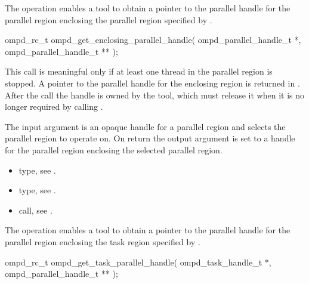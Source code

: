 \label{subsubsubsec:ompd_get_enclosing_parallel_handle}
\summary
The    operation enables a tool to obtain a
pointer to the parallel handle for the parallel region enclosing the parallel region specified by
.

\format

\begin{cspecific}
\begin{ompSyntax}
ompd_rc_t ompd_get_enclosing_parallel_handle(
  ompd_parallel_handle_t *,
  ompd_parallel_handle_t **
);
\end{ompSyntax}
\end{cspecific}


\descr
This call is meaningful only if at least one thread in the parallel region is stopped.
A pointer to the parallel handle for the enclosing region is returned in
. After the call the handle is owned by the tool, which must
release it when it is no longer required by calling .

\argdesc
The input argument  is an opaque handle for a parallel region and selects the parallel region to operate on.
On return the output argument  is set to a handle for the parallel region
enclosing the selected parallel region.

\crossreferences
\begin{itemize}
  \item {} type, see .
	\item {} type, see .
	\item {} call, see .
\end{itemize}

\label{subsubsubsec:ompd_get_task_parallel_handle}
\summary
The    operation enables a tool to obtain a
pointer to the parallel handle for the parallel region enclosing the task region specified by
.

\format

\begin{cspecific}
\begin{ompSyntax}
ompd_rc_t ompd_get_task_parallel_handle(
  ompd_task_handle_t *,
  ompd_parallel_handle_t **
);
\end{ompSyntax}
\end{cspecific}


